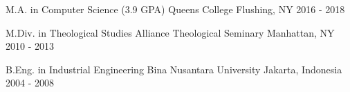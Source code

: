 

\begin{cventries}

  \cventry
  {M.A. in Computer Science (3.9 GPA)} %
    {Queens College} %
    {Flushing, NY} %
    {2016 - 2018} %
    {
      \begin{cvitems} %
      \end{cvitems}
    }

  \cventry
    {M.Div. in Theological Studies} %
    {Alliance Theological Seminary} %
    {Manhattan, NY} %
    {2010 - 2013} %
    {
      \begin{cvitems} %
      \end{cvitems}
    }

  \cventry
    {B.Eng. in Industrial Engineering} %
    {Bina Nusantara University} %
    {Jakarta, Indonesia} %
    {2004 - 2008} %
    {
      \begin{cvitems} %
      \end{cvitems}
    }

\end{cventries}
